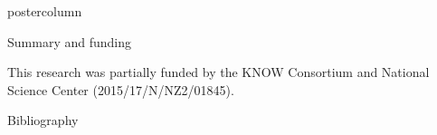 \documentclass[final]{beamer}\usepackage[]{graphicx}\usepackage[]{color}
\begin{document}
\begin{frame}
\begin{columns}
\begin{column}{.48\textwidth}
\begin{beamercolorbox}[center,wd=\textwidth]{postercolumn}
\begin{minipage}[T]{.95\textwidth}
{\begin{block}{Summary and funding}
\bigskip

\small{This research was partially funded by the KNOW Consortium and National Science Center (2015/17/N/NZ2/01845).}

\end{block}
\vfill

 \begin{block}{Bibliography}
  \tiny{
  
  
  }
  \end{block}
  \vfill  


}
\end{minipage}
\end{beamercolorbox}
\end{column}
\end{columns}  
\end{frame}
\end{document}

